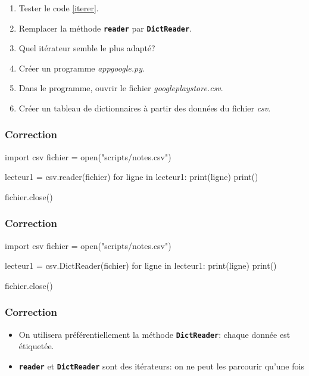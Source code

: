 \documentclass[svgnames,11pt]{beamer}
\begin{document}
\begin{frame}
    \frametitle{}

    \begin{activite}
        \begin{enumerate}
            \item Tester le code \ref{iterer}.
            \item Remplacer la méthode \textbf{\texttt{reader}} par \textbf{\texttt{DictReader}}.
            \item Quel itérateur semble le plus adapté?
            \item Créer un programme \emph{appgoogle.py}.
            \item Dans le programme, ouvrir le fichier \emph{googleplaystore.csv}.
            \item Créer un tableau de dictionnaires à partir des données du fichier \emph{csv}.
        \end{enumerate}
    \end{activite}


\end{frame}
\begin{frame}[fragile]
    \frametitle{Correction}
    
    \begin{pycode}
import csv
fichier = open("scripts/notes.csv")

lecteur1 = csv.reader(fichier)
for ligne in lecteur1:
    print(ligne)
    print()

fichier.close()
    \end{pycode}

\end{frame}
\begin{frame}[fragile]
    \frametitle{Correction}
    
    \begin{pycode}
import csv
fichier = open("scripts/notes.csv")

lecteur1 = csv.DictReader(fichier)
for ligne in lecteur1:
    print(ligne)
    print()

fichier.close()
    \end{pycode}
\end{frame}
\begin{frame}
    \frametitle{Correction}

    \begin{itemize}
        \item On utilisera préférentiellement la méthode \textbf{\texttt{DictReader}}: chaque donnée est étiquetée.
        \item \texttt{\textbf{reader}} et \texttt{\textbf{DictReader}} sont des itérateurs: on ne peut les parcourir qu'une fois
    \end{itemize}

\end{frame}
\end{document}
